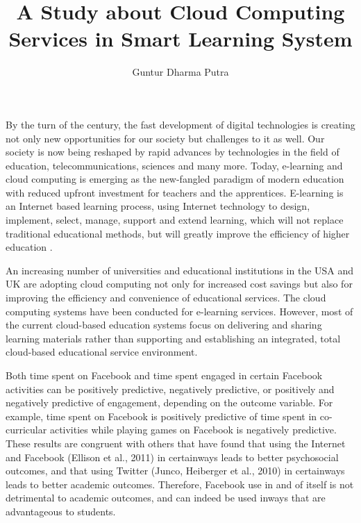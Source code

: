 \documentclass[journal]{vgtc}                %
\title{A Study about Cloud Computing Services in Smart Learning System}
\author{Guntur Dharma Putra}
\begin{document}

\maketitle

By the turn of the century, the fast development of digital technologies is creating not only new opportunities for our society but challenges to it as well. Our society is now being reshaped by rapid advances by technologies in the field of education, telecommunications, sciences and many more. Today, e-learning and cloud computing is emerging as the new-fangled paradigm of modern education with reduced upfront investment for teachers and the apprentices. E-learning is an Internet based learning process, using Internet technology to design, implement, select, manage, support and extend learning, which will not replace traditional educational methods, but will greatly improve the efficiency of higher education \cite{SudhirKumarSharmaNidhiGoyal2014}.

An increasing number of universities and educational institutions in the USA and UK are adopting cloud computing not only for increased cost savings but also for improving the efficiency and convenience of educational services. The cloud computing systems have been conducted for e-learning services. However, most of the current cloud-based education systems focus on delivering and sharing learning materials rather than supporting and establishing an integrated, total cloud-based educational service environment.

Both time spent on Facebook and time spent engaged in certain Facebook activities can be positively predictive, negatively predictive, or positively and negatively predictive of engagement, depending on the outcome variable. For example, time spent on Facebook is positively predictive of time spent in co-curricular activities while playing games on Facebook is negatively predictive. These results are congruent with others that have found that using the Internet and Facebook (Ellison et al., 2011) in certainways leads to better psychosocial outcomes, and that using Twitter (Junco, Heiberger et al., 2010) in certainways leads to better academic outcomes. Therefore, Facebook use in and of itself is not detrimental to academic outcomes, and can indeed be used inways that are advantageous to students.
\end{document}
